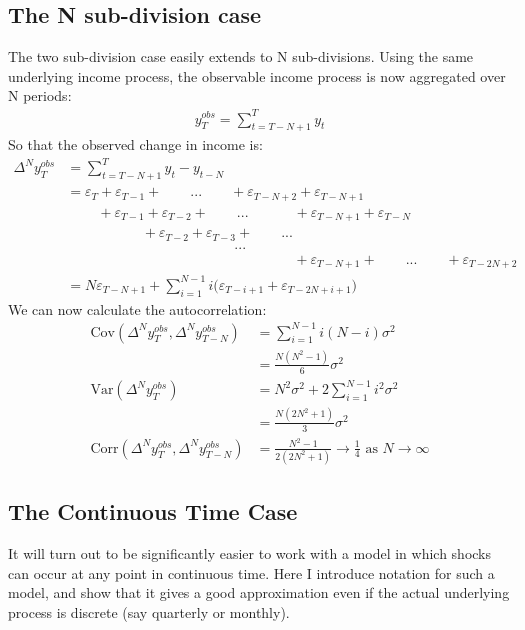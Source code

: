\documentclass[AER]{AEA}
\begin{document}
\subsection{The N sub-division case}
The two sub-division case easily extends to N sub-divisions. Using the same underlying income process, the observable income process is now aggregated over N periods:
\begin{align*}
y_T^{obs} = \sum_{t=T-N+1}^{T} y_t
\end{align*}
So that the observed change in income is:
\begin{align*}
\Delta^N y_T^{obs} &= \sum_{t=T-N+1}^{T} y_t - y_{t-N} \\
&= \varepsilon_T + \varepsilon_{T-1} +  \qquad...  \qquad+ \varepsilon_{T-N+2} + \varepsilon_{T-N+1} \\
& \qquad \   +  \varepsilon_{T-1} + \varepsilon_{T-2}  + \qquad...  \qquad \quad \ + \varepsilon_{T-N+1} + \varepsilon_{T-N} \\
& \qquad \qquad  \quad \ \, +  \varepsilon_{T-2} + \varepsilon_{T-3} + \qquad ... \\
& \qquad \qquad \qquad \qquad \qquad \qquad ...\\
& \qquad \qquad \qquad \qquad \qquad \qquad \qquad \qquad \ +  \varepsilon_{T-N+1} +\qquad ...  \qquad + \varepsilon_{T-2N+2} \\
&= N \varepsilon_{T-N+1} + \sum_{i=1}^{N-1} i\Big(\varepsilon_{T-i+1} + \varepsilon_{T-2N+i+1} \Big)
\end{align*}
We can now calculate the autocorrelation:
\begin{align*}
\mathrm{Cov}(\Delta^N y_T^{obs},\Delta^N y_{T-N}^{obs}) &=\sum_{i=1}^{N-1} i(N-i) \sigma^2 \\
&=  \frac{N(N^2-1)}{6} \sigma^2 \\
\mathrm{Var}(\Delta^N y_T^{obs}) &= N^2\sigma^2 + 2\sum_{i=1}^{N-1} i^2 \sigma^2 \\
&= \frac{N(2N^2+1)}{3}\sigma^2 \\
\mathrm{Corr}(\Delta^N y_T^{obs},\Delta^N y_{T-N}^{obs}) &= \frac{N^2-1}{2(2N^2+1)} \rightarrow \frac{1}{4} \text{ as } N \rightarrow \infty
\end{align*}

\subsection{The Continuous Time Case} \label{cont_time_case}
It will turn out to be significantly easier to work with a model in which shocks can occur at any point in continuous time. Here I introduce notation for such a model, and show that it gives a good approximation even if the actual underlying process is discrete (say quarterly or monthly).
\end{document}

